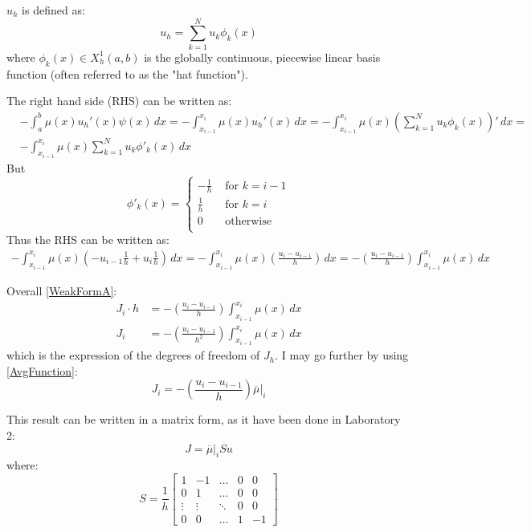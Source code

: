 \documentclass{article}
\begin{document}
$u_h$ is defined as:
\begin{equation}
    u_h = \sum_{k=1}^{N} u_k \phi_k(x)
    \label{eq:u_hDef}
\end{equation}
where $\phi_k(x) \in X_h^1(a,b)$ is the globally continuous, piecewise linear basis function (often referred to as the "hat function").

The right hand side (RHS) can be written as:
\begin{align*}
    & -\int_{a}^{b} \mu(x)u_h'(x) \psi(x) \, dx = -\int_{x_{i-1}}^{x_i} \mu(x)u_h'(x) \, dx =  -\int_{x_{i-1}}^{x_i} \mu(x) \left(\sum_{k=1}^{N} u_k \phi_k(x)\right)' \, dx = \\
    &  - \int_{x_{i-1}}^{x_i} \mu(x) \sum_{k=1}^{N} u_k \phi'_k(x) \, dx
\end{align*}
 But 
\begin{equation*}
\phi'_k(x) =
    \begin{cases}
           -\frac{1}{h} &\text{  for } k=i-1 \\
          
           \frac{1}{h} &\text{  for } k = i  \\
          
           0 &\text{ otherwise }  \\
    \end{cases}
\end{equation*}
 Thus the RHS can be written as: 
 \begin{align*}
    -\int_{x_{i-1}}^{x_i} \mu(x) \left(- u_{i-1} \frac{1}{h} + u_i \frac{1}{h} \right) \, dx = -\int_{x_{i-1}}^{x_i} \mu(x) \left(\frac{u_i - u_{i-1}}{h}  \right) \, dx= -\left(\frac{u_i - u_{i-1}}{h}  \right) \int_{x_{i-1}}^{x_i} \mu(x) \, dx
 \end{align*}

Overall \eqref{WeakFormA}:
\begin{align}
    J_i \cdot h &= - \left(\frac{u_i - u_{i-1}}{h}  \right) \int_{x_{i-1}}^{x_i} \mu(x) \, dx \\
    J_i & = - \left(\frac{u_i - u_{i-1}}{h^2}  \right) \int_{x_{i-1}}^{x_i} \mu(x) \, dx
\end{align}
which is the expression of the degrees of freedom of $J_h$. I may go further by using \eqref{AvgFunction}:
\begin{equation}
    J_i  = - \left(\frac{u_i - u_{i-1}}{h}  \right)  \overline{\mu}|_i
    \label{eq:primflux}
\end{equation}

This result can be written in a matrix form, as it have been done in Laboratory 2:
\begin{equation*}
    J=\overline{\mu}|_i S u
\end{equation*}
where:
\begin{equation*}
    S = \frac{1}{h}
    \begin{bmatrix}
        1 & -1 & \dots & 0 & 0 \\
        0 & 1 & \dots & 0 & 0 \\
        \vdots & \vdots & \ddots & 0 & 0 \\
        0 & 0 & \dots & 1 & -1
    \end{bmatrix}      
\end{equation*}
\end{document}

